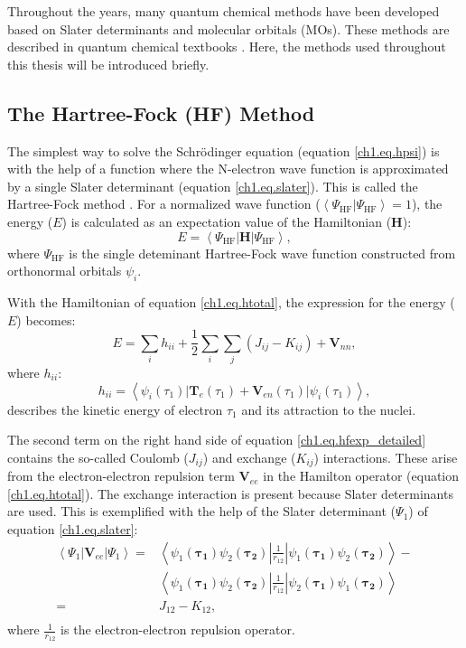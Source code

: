 Throughout the years, many quantum chemical methods have been developed based on Slater determinants and molecular orbitals (MOs). These methods are described in quantum chemical textbooks \cite{szabo}. Here, the methods used throughout this thesis will be introduced briefly.

\subsection{The Hartree-Fock (HF) Method}
The simplest way to solve the Schr\"{o}dinger equation (equation \ref{ch1.eq.hpsi}) is with the help of a function where the N-electron wave function is approximated by a single Slater determinant (equation \ref{ch1.eq.slater}). This is called the Hartree-Fock method \cite{hartree1,hartree2,hartree3,fock}. For a normalized wave function ($\left< \Psi_\mathrm{HF} | \Psi_\mathrm{HF} \right> = 1$), the energy ($E$) is calculated as an expectation value of the Hamiltonian ($\mathbf{H}$):
\begin{equation}
E=\left< \Psi_\mathrm{HF} | \mathbf{H} | \Psi_\mathrm{HF} \right>,
\label{ch1.eq.hfexp}
\end{equation}
where $\Psi_\mathrm{HF}$ is the single deteminant Hartree-Fock wave function constructed from orthonormal orbitals $\psi_i$.

With the Hamiltonian of equation \ref{ch1.eq.htotal}, the expression for the energy ($E$) becomes:
\begin{equation}
E=\sum_i h_{ii} + \frac{1}{2} \sum_i\sum_j (J_{ij} - K_{ij}) + \mathbf{V}_{nn},
\label{ch1.eq.hfexp_detailed}
\end{equation}
where $h_{ii}$:
\begin{equation}
h_{ii} = \left< \psi_i(\tau_1) | \mathbf{T}_{e}(\tau_1) + \mathbf{V}_{en}(\tau_1) | \psi_i(\tau_1)\right>,
\end{equation}
describes the kinetic energy of electron $\tau_1$ and its attraction to the nuclei.

The second term on the right hand side of equation \ref{ch1.eq.hfexp_detailed} contains the so-called Coulomb ($J_{ij}$) and exchange ($K_{ij}$) interactions. These arise from the electron-electron repulsion term $\mathbf{V}_{ee}$ in the Hamilton operator (equation \ref{ch1.eq.htotal}). The exchange interaction is present because Slater determinants are used. This is exemplified with the help of the Slater determinant ($\Psi_1$) of equation \ref{ch1.eq.slater}:
\begin{equation}
\begin{split}
\left< \Psi_1 | \mathbf{V}_{ee} | \Psi_1 \right> = & \left< \psi_1(\mathbf{\tau_1})\psi_2(\mathbf{\tau_2}) | \frac{1}{r_{12}} | \psi_1(\mathbf{\tau_1})\psi_2(\mathbf{\tau_2}) \right> - \\
& \left< \psi_1(\mathbf{\tau_1})\psi_2(\mathbf{\tau_2}) | \frac{1}{r_{12}} | \psi_2(\mathbf{\tau_1})\psi_1(\mathbf{\tau_2}) \right> \\
= & J_{12} - K_{12}, \\
\end{split}
\end{equation}
where $\frac{1}{r_{12}}$ is the electron-electron repulsion operator.


